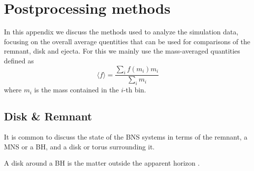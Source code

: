 \chapter{Postprocessing methods} \label{app:ppr}




In this appendix we discuss the methods used to analyze the simulation data,
focusing on the overall average quentities that can be used for comparisons 
of the remnant, disk and ejecta. 
%
For this we mainly use the mass-averaged quantities defined as 
%
\begin{equation}
\langle f \rangle = \frac{\sum_i f(m_i)m_i}{\sum_i m_i}
\end{equation}
%
where $m_i$ is the mass contained in the $i$-th bin.



\section{Disk \& Remnant}\label{sec:bns_sims:method:disk}

It is common to discuss the \pmerg{} state of the \ac{BNS} systems in terms of the remnant, 
a \ac{MNS} or a \ac{BH}, and a disk or torus surrounding it. 

A disk around a \ac{BH} is the matter outside the apparent horizon 
\citep[\eg]{Dietrich:2015iva,Dietrich:2016hky}. 

